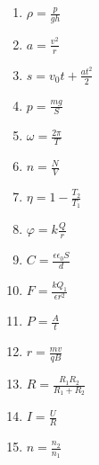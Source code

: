 \begin{enumerate}

\item $\rho =\frac{p}{gh}$

\item $a=\frac{v^2}{r}$

\item  $s=v_0t+\frac{at^2}{2}$

\item  $p=\frac{mg}{S}$

\item  $\omega =\frac{2\pi }{T}$

\item  $n=\frac{N}{V}$

\item  $\eta =1-\frac{T_2}{T_1}$

\item  $\varphi =k\frac{Q}{r}$

\item  $C=\frac{\epsilon \epsilon_0S}{d}$

\item  $F=\frac{kQ_1}{\epsilon r^2}$

\item  $P=\frac{A}{t}$

\item  $r=\frac{mv}{qB}$

\item  $R=\frac{R_1R_2}{R_1+R_2}$

\item  $I=\frac{U}{R}$

\item  $n=\frac{n_2}{n_1}$

\end{enumerate}

\labworkquestions

